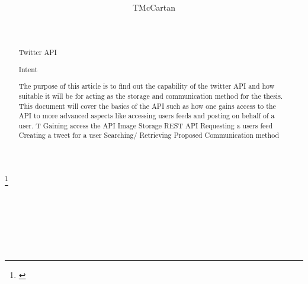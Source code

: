 \documentclass[12pt]{article}
\theoremstyle{definition}
\theoremstyle{remark}
\numberwithin{equation}{section}
\begin{document}
\title[Forensic Twitter API Anaylsis]{}%
\author{TMcCartan}%
\address{}%
\thanks{}%
\date{}%
\begin{abstract}
  Twitter API
  
  Intent
  
  The purpose of this article is to find out the capability of the twitter API and how suitable it will be for acting as the storage and communication method for the thesis. This document will cover the basics of the API such as how one gains access to the API to more advanced aspects like accessing users feeds and posting on behalf of a user. T  
  Gaining access the API
  Image Storage
  REST API
    Requesting a users feed
    Creating a tweet for a user
    Searching/ Retrieving
  Proposed Communication method
  
  
\end{abstract}
\maketitle
\section{}


\end{document}
